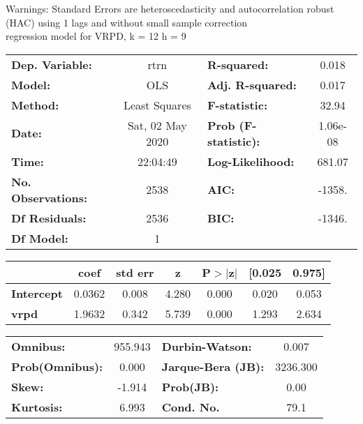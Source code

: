 Warnings: \newline
 [1] Standard Errors are heteroscedasticity and autocorrelation robust (HAC) using 1 lags and without small sample correction\\ 

regression model for VRPD, k = 12 h = 9\begin{center}
\begin{tabular}{lclc}
\toprule
\textbf{Dep. Variable:}    &       rtrn       & \textbf{  R-squared:         } &     0.018   \\
\textbf{Model:}            &       OLS        & \textbf{  Adj. R-squared:    } &     0.017   \\
\textbf{Method:}           &  Least Squares   & \textbf{  F-statistic:       } &     32.94   \\
\textbf{Date:}             & Sat, 02 May 2020 & \textbf{  Prob (F-statistic):} &  1.06e-08   \\
\textbf{Time:}             &     22:04:49     & \textbf{  Log-Likelihood:    } &    681.07   \\
\textbf{No. Observations:} &        2538      & \textbf{  AIC:               } &    -1358.   \\
\textbf{Df Residuals:}     &        2536      & \textbf{  BIC:               } &    -1346.   \\
\textbf{Df Model:}         &           1      & \textbf{                     } &             \\
\bottomrule
\end{tabular}
\begin{tabular}{lcccccc}
                   & \textbf{coef} & \textbf{std err} & \textbf{z} & \textbf{P$> |$z$|$} & \textbf{[0.025} & \textbf{0.975]}  \\
\midrule
\textbf{Intercept} &       0.0362  &        0.008     &     4.280  &         0.000        &        0.020    &        0.053     \\
\textbf{vrpd}      &       1.9632  &        0.342     &     5.739  &         0.000        &        1.293    &        2.634     \\
\bottomrule
\end{tabular}
\begin{tabular}{lclc}
\textbf{Omnibus:}       & 955.943 & \textbf{  Durbin-Watson:     } &    0.007  \\
\textbf{Prob(Omnibus):} &   0.000 & \textbf{  Jarque-Bera (JB):  } & 3236.300  \\
\textbf{Skew:}          &  -1.914 & \textbf{  Prob(JB):          } &     0.00  \\
\textbf{Kurtosis:}      &   6.993 & \textbf{  Cond. No.          } &     79.1  \\
\bottomrule
\end{tabular}
\end{center}

